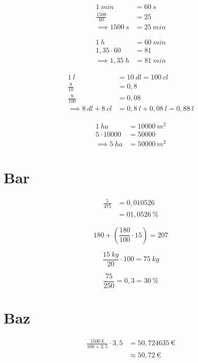 \begin{align*}
1\ min &= 60\ s \\
\frac{1500}{60} &= 25 \\
\implies 1500\ s &= 25\ min
\end{align*}


\begin{align*}
1\ h &= 60\ min \\
1,35 \cdot 60 &= 81 \\
\implies 1,35\ h &= 81\ min
\end{align*}


\begin{align*}
1\ l &= 10\ dl = 100\ cl \\
\frac{8}{10} &= 0,8 \\
\frac{8}{100} &= 0,08 \\
\implies 8\ dl + 8\ cl &= 0,8\ l + 0,08\ l = 0,88\ l
\end{align*}


\begin{align*}
1\ ha &= 10000\ m^2 \\
5 \cdot 10000 &= 50000 \\
\implies 5\ ha &= 50000\ m^2
\end{align*}


\chapter{Bar}

\begin{align*}
\frac{5}{475} &= 0,010526 \\
              &=  01,0526\ \%
\end{align*}



\[
180 + \left ( \frac{180}{100} \cdot 15 \right ) = 207
\]




\[
\frac{15\ kg}{20} \cdot 100 = 75\ kg
\]




\[
\frac{75}{250} = 0,3 = 30\ \%
\]


\chapter{Baz}



\begin{align*}
\frac{1500\ \text{€}}{100 + 3,5} \cdot 3,5 &= 50,724635\ \text{€}  \\
                                 &\approx 50,72\ \text{€}
\end{align*}




